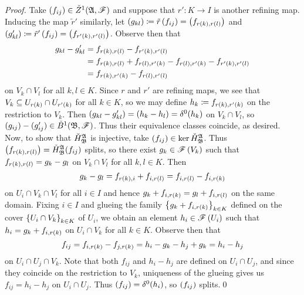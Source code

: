 \documentclass[../Moduli_Spaces_of_Riemann_Surfaces.tex]{subfiles}
\begin{document}
    \begin{proof}
        Take $\left(f_{ij}\right)\in\check{Z}^1\!\left(\mathfrak{A},\mathscr{F}\right)$ and suppose that $r':K\to I$ is another refining map. Inducing the map $\tilde{r}'$ similarly, let $\left(g_{kl}\right)\coloneqq\tilde{r}\left(f_{ij}\right)=\left(f_{r\left(k\right),r\left(l\right)}\right)$ and $(g'_{kl})\coloneqq\tilde{r}'\left(f_{ij}\right)=\left(f_{r'\left(k\right),r'\left(l\right)}\right)$. Observe then that
        \begin{equation*}
            \begin{aligned}
                g_{kl}-g_{kl}'&=f_{r\left(k\right),r\left(l\right)}-f_{r'\left(k\right),r'\left(l\right)} \\
                              &=f_{r\left(k\right),r\left(l\right)}+f_{r\left(l\right),r'\left(k\right)}-f_{r\left(l\right),r'\left(k\right)}-f_{r'\left(k\right),r'\left(l\right)} \\
                              &=f_{r\left(k\right),r'\left(k\right)}-f_{r\left(l\right),r'\left(l\right)}
            \end{aligned}
        \end{equation*}
        on $V_k\cap V_l$ for all $k,l\in K$. Since $r$ and $r'$ are refining maps, we see that $V_k\subseteq U_{r\left(k\right)}\cap U_{r'\left(k\right)}$ for all $k\in K$, so we may define $h_k\coloneqq f_{r\left(k\right),r'\left(k\right)}$ on the restriction to $V_k$. Then $\left(g_{kl}-g_{kl}'\right)=\left(h_k-h_l\right)=\delta^0\!\left(h_k\right)$ on $V_k\cap V_l$, so $\left(g_{ij}\right)-(g_{ij}')\in\check{B}^1\!\left(\mathfrak{B},\mathscr{F}\right)$. Thus their equivalence classes coincide, as desired. Now, to show that $\check{H}_{\mathfrak{B}}^{\mathfrak{A}}$ is injective, take $\left(f_{ij}\right)\in\ker\check{H}_{\mathfrak{B}}^{\mathfrak{A}}$. Thus $\left(f_{r\left(k\right),r\left(l\right)}\right)=\check{H}_{\mathfrak{B}}^{\mathfrak{A}}\!\left(f_{ij}\right)$ splits, so there exist $g_k\in\mathscr{F}\left(V_k\right)$ such that $f_{r\left(k\right),r\left(l\right)}=g_k-g_l$ on $V_k\cap V_l$ for all $k,l\in K$. Then
        \begin{equation*}
            g_k-g_l=f_{r\left(k\right),i}+f_{i,r\left(l\right)}=f_{i,r\left(l\right)}-f_{i,r\left(k\right)}
        \end{equation*}
        on $U_i\cap V_k\cap V_l$ for all $i\in I$ and hence $g_k+f_{i,r\left(k\right)}=g_l+f_{i,r\left(l\right)}$ on the same domain. Fixing $i\in I$ and glueing the family $\left\{g_k+f_{i,r\left(k\right)}\right\}_{k\in K}$ defined on the cover $\left\{U_i\cap V_k\right\}_{k\in K}$ of $U_i$, we obtain an element $h_i\in\mathscr{F}\left(U_i\right)$ such that $h_i=g_k+f_{i,r\left(k\right)}$ on $U_i\cap V_k$ for all $k\in K$. Observe then that
        \begin{equation*}
            f_{ij}=f_{i,r\left(k\right)}-f_{j,r\left(k\right)}=h_i-g_k-h_j+g_k=h_i-h_j
        \end{equation*}
        on $U_i\cap U_j\cap V_k$. Note that both $f_{ij}$ and $h_i-h_j$ are defined on $U_i\cap U_j$, and since they coincide on the restriction to $V_k$, uniqueness of the glueing gives us $f_{ij}=h_i-h_j$ on $U_i\cap U_j$. Thus $\left(f_{ij}\right)=\delta^0\!\left(h_i\right)$, so $\left(f_{ij}\right)$ splits.\qed
    \end{proof}
\end{document}
